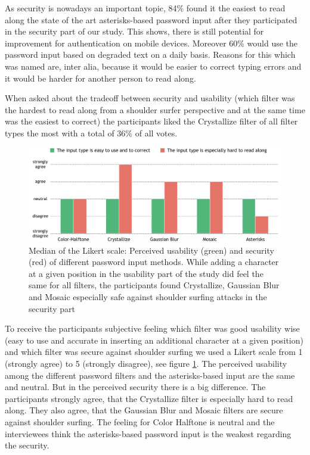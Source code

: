 \documentclass{sigchi}
\begin{document}
As security is nowadays an important topic, 84\% found it the easiest to read along the state of the art asterisks-based password input after they participated in the security part of our study. This shows, there is still potential for improvement for authentication on mobile devices. Moreover 60\% would use the password input based on degraded text on a daily basis. Reasons for this which was named are, inter alia, because it would be easier to correct typing errors and it would be harder for another person to read along.

When asked about the tradeoff between security and usability (which filter was the hardest to read along from a shoulder surfer perspective and at the same time was the easiest to correct) the participants liked the Crystallize filter of all filter types the most with a total of 36\% of all votes. 

\begin{figure}[h]
    \centering
    \includegraphics[width=\columnwidth]{figures/figure4.png}
    \caption{Median of the Likert scale: Perceived usability (green) and security (red) of different password input methods. While adding a character at a given position in the usability part of the study did feel the same for all filters, the participants found Crystallize, Gaussian Blur and Mosaic especially safe against shoulder surfing attacks in the security part}
    \label{fig:concluding_survey}
    \vspace{-3mm}
\end{figure}

To receive the participants subjective feeling which filter was good usability wise (easy to use and accurate in inserting an additional character at a given position) and which filter was secure against shoulder surfing we used a Likert scale from 1 (strongly agree) to 5 (strongly disagree), see figure \ref{fig:concluding_survey}.
The perceived usability among the different password filters and the asterisks-based input are the same and neutral. But in the perceived security there is a big difference. The participants strongly agree, that the Crystallize filter is especially hard to read along. They also agree, that the Gaussian Blur and Mosaic filters are secure against shoulder surfing. The feeling for Color Halftone is neutral and the interviewees think the asterisks-based password input is the weakest regarding the security.
\end{document}
